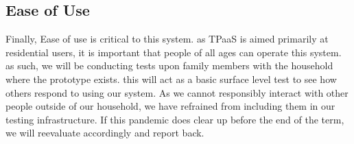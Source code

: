 \subsection{Ease of Use}
Finally, Ease of use is critical to this system. as TPaaS is aimed primarily at residential users, it is important that people of all ages can operate this system. as such, we will be conducting tests upon family members with the household where the prototype exists. this will act as a basic surface level test to see how others respond to using our system. As we cannot responsibly interact with other people outside of our household, we have refrained from including them in our testing infrastructure. If this pandemic does clear up before the end of the term, we will reevaluate accordingly and report back.